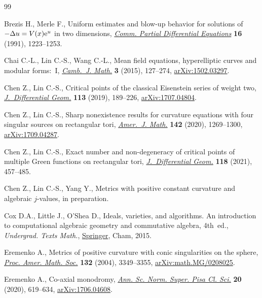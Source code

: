 \begin{thebibliography}{99}
\footnotesize\itemsep=0pt

Brezis H., Merle F., Uniform estimates and blow-up behavior for solutions of
 {$-\Delta u=V(x){\rm e}^u$} in two dimensions, \href{https://doi.org/10.1080/03605309108820797}{\textit{Comm. Partial Differential
 Equations}} \textbf{16} (1991), 1223--1253.

Chai C.-L., Lin C.-S., Wang C.-L., Mean field equations, hyperelliptic curves and
 modular forms:~{I}, \href{https://doi.org/10.4310/CJM.2015.v3.n1.a3}{\textit{Camb.~J. Math.}} \textbf{3} (2015), 127--274,
 \href{https://arxiv.org/abs/1502.03297}{arXiv:1502.03297}.

Chen Z., Lin C.-S., Critical points of the classical {E}isenstein series of
 weight two, \href{https://doi.org/10.4310/jdg/1571882423}{\textit{J.~Differential Geom.}} \textbf{113} (2019), 189--226,
 \href{https://arxiv.org/abs/1707.04804}{arXiv:1707.04804}.

Chen Z., Lin C.-S., Sharp nonexistence results for curvature equations with four
 singular sources on rectangular tori, \href{https://doi.org/10.1353/ajm.2020.0028}{\textit{Amer.~J. Math.}} \textbf{142}
 (2020), 1269--1300, \href{https://arxiv.org/abs/1709.04287}{arXiv:1709.04287}.

Chen Z., Lin C.-S., Exact number and non-degeneracy of critical points of
 multiple {G}reen functions on rectangular tori, \href{https://doi.org/10.4310/jdg/1625860623}{\textit{J.~Differential
 Geom.}} \textbf{118} (2021), 457--485.

Chen Z., Lin C.-S., Yang Y., Metrics with positive constant curvature and
 algebraic $j$-values, {i}n preparation.

Cox D.A., Little J., O'Shea D., Ideals, varieties, and algorithms. {A}n
 introduction to computational algebraic geometry and commutative algebra, 4th~ed., \textit{Undergrad. Texts Math.}, \href{https://doi.org/10.1007/978-3-319-16721-3}{Springer}, Cham, 2015.

Eremenko A., Metrics of positive curvature with conic singularities on the
 sphere, \href{https://doi.org/10.1090/S0002-9939-04-07439-8}{\textit{Proc. Amer. Math. Soc.}} \textbf{132} (2004), 3349--3355,
 \href{https://arxiv.org/abs/math.MG/0208025}{arXiv:math.MG/0208025}.

Eremenko A., Co-axial monodromy, \href{https://doi.org/10.2422/2036-2145.201706_022}{\textit{Ann. Sc. Norm. Super. Pisa Cl. Sci.}}
 \textbf{20} (2020), 619--634, \href{https://arxiv.org/abs/1706.04608}{arXiv:1706.04608}.


\end{thebibliography}
